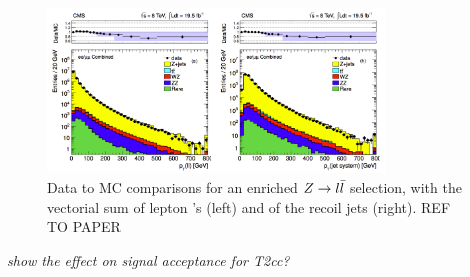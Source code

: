 \begin{figure}[h]
  \begin{center}
    \includegraphics[width=0.8\textwidth]{Figs/isr/isr_zjets_distros.pdf}
    \caption{Data to MC comparisons for an enriched $Z \rightarrow l\bar{l}$ selection, 
    with the vectorial sum of lepton \Pt's (left) and of the recoil jets (right).
    REF TO PAPER}
    \label{fig:isr_datamc}
  \end{center}
\end{figure}

\emph{show the effect on signal acceptance for T2cc?}


